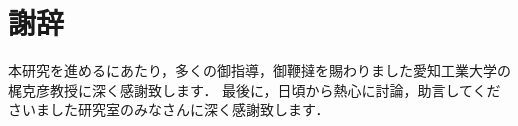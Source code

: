 \chapter*{謝辞}


本研究を進めるにあたり，多くの御指導，御鞭撻を賜わりました愛知工業大学の梶克彦教授に深く感謝致します．
最後に，日頃から熱心に討論，助言してくださいました研究室のみなさんに深く感謝致します．

